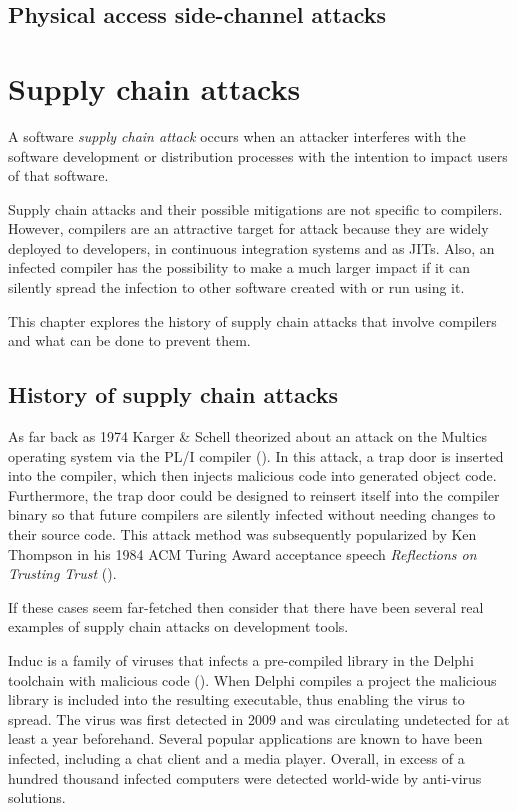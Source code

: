 \documentclass[
  a4paper,
]{report}
\begin{document}
\section{Physical access side-channel
attacks}\label{physical-access-side-channel-attacks}

\chapter{Supply chain attacks}\label{supply-chain-attacks}

A software \emph{supply chain attack} occurs when an attacker interferes
with the software development or distribution processes with the
intention to impact users of that software.

Supply chain attacks and their possible mitigations are not specific to
compilers. However, compilers are an attractive target for attack
because they are widely deployed to developers, in continuous
integration systems and as JITs. Also, an infected compiler has the
possibility to make a much larger impact if it can silently spread the
infection to other software created with or run using it.

This chapter explores the history of supply chain attacks that involve
compilers and what can be done to prevent them.

\section{History of supply chain
attacks}\label{history-of-supply-chain-attacks}

As far back as 1974 Karger \& Schell theorized about an attack on the
Multics operating system via the PL/I compiler
(). In this attack,
a trap door is inserted into the compiler, which then injects malicious
code into generated object code. Furthermore, the trap door could be
designed to reinsert itself into the compiler binary so that future
compilers are silently infected without needing changes to their source
code. This attack method was subsequently popularized by Ken Thompson in
his 1984 ACM Turing Award acceptance speech \emph{Reflections on
Trusting Trust} ().

If these cases seem far-fetched then consider that there have been
several real examples of supply chain attacks on development tools.

Induc is a family of viruses that infects a pre-compiled library in the
Delphi toolchain with malicious code (). When Delphi compiles a project the malicious library is included
into the resulting executable, thus enabling the virus to spread. The
virus was first detected in 2009 and was circulating undetected for at
least a year beforehand. Several popular applications are known to have
been infected, including a chat client and a media player. Overall, in
excess of a hundred thousand infected computers were detected world-wide
by anti-virus solutions.
\end{document}
